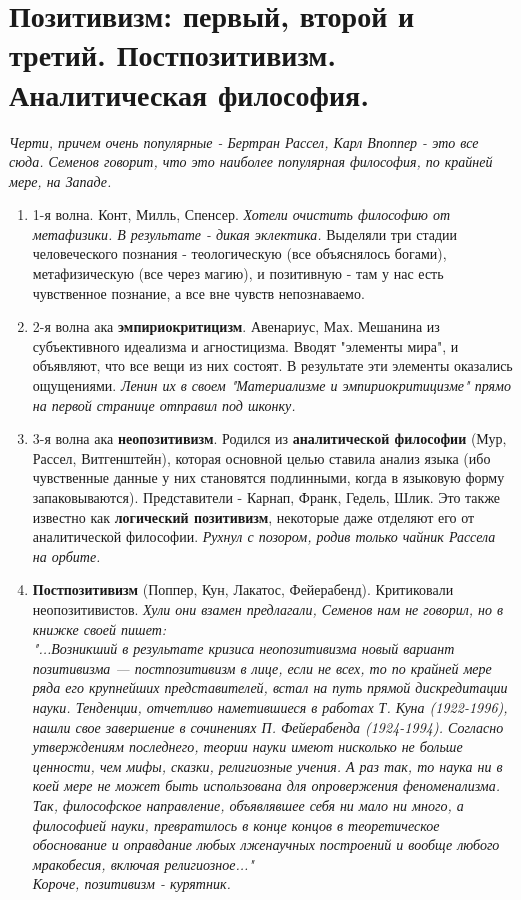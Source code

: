 \section{Позитивизм: первый, второй и третий. Постпозитивизм. Аналитическая философия.}
\textit{Черти, причем очень популярные - Бертран Рассел, Карл Впоппер - это все сюда. Семенов говорит, что это наиболее популярная философия, по крайней мере, на Западе.}
\begin{enumerate}

\item 1-я волна. Конт, Милль, Спенсер.
\textit{Хотели очистить философию от метафизики. В результате - дикая эклектика.} 
Выделяли три стадии человеческого познания - теологическую (все объяснялось богами), метафизическую (все через магию), и позитивную - там у нас есть чувственное познание, а все вне чувств непознаваемо.
\item 2-я волна ака \textbf{эмпириокритицизм}. Авенариус, Мах.
Мешанина из субъективного идеализма и агностицизма. Вводят "элементы мира", и объявляют, что все вещи из них состоят. В результате эти элементы оказались ощущениями. \textit{Ленин их в своем "Материализме и эмпириокритицизме" прямо на первой странице отправил под шконку.}
\item 3-я волна ака \textbf{неопозитивизм}. Родился из \textbf{аналитической философии} (Мур, Рассел, Витгенштейн), которая основной целью ставила  анализ языка (ибо чувственные данные у них становятся подлинными, когда в языковую форму запаковываются). Представители - Карнап, Франк, Гедель, Шлик. Это также известно как \textbf{логический позитивизм}, некоторые даже отделяют его от аналитической философии. \textit{Рухнул с позором, родив только чайник Рассела на орбите.}
\item \textbf{Постпозитивизм} (Поппер, Кун, Лакатос, Фейерабенд). Критиковали неопозитивистов.
\textit{Хули они взамен предлагали, Семенов нам не говорил, но в книжке своей пишет:\\
"...Возникший в результате кризиса неопозитивизма новый вариант позитивизма —
постпозитивизм в лице, если не всех, то по крайней мере ряда его крупнейших
представителей, встал на путь прямой дискредитации науки. Тенденции, отчетливо
наметившиеся в работах Т. Куна (1922-1996), нашли свое завершение в сочинениях
П. Фейерабенда (1924-1994). Согласно утверждениям последнего, теории науки
имеют нисколько не больше ценности, чем мифы, сказки, религиозные учения. А
раз так, то наука ни в коей мере не может быть использована для опровержения
феноменализма. Так, философское направление, объявлявшее себя ни мало ни
много, а философией науки, превратилось в конце концов в теоретическое
обоснование и оправдание любых лженаучных построений и вообще любого
мракобесия, включая религиозное..."\\
Короче, позитивизм - курятник.
}
\end{enumerate}

